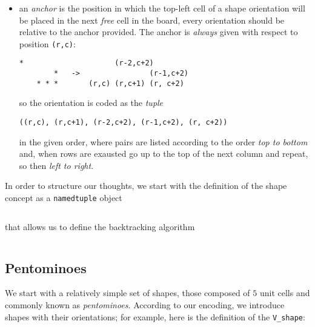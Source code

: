 \begin{itemize}
    \item an \textit{anchor} is the position in which the top-left cell of
    a shape orientation will be placed in the next \textit{free} cell in the
    board, every orientation should be relative to the anchor provided.
    The anchor is \textit{always} given with respect to position \verb|(r,c)|:
    \begin{Verbatim}[baselinestretch=0.8]
        *                     (r-2,c+2)
        *   ->                (r-1,c+2)
    * * *       (r,c) (r,c+1) (r, c+2)
    \end{Verbatim}
    so the orientation is coded as the \textit{tuple}
    \begin{Verbatim}[baselinestretch=0.8]
    ((r,c), (r,c+1), (r-2,c+2), (r-1,c+2), (r, c+2))
    \end{Verbatim}
    in the given order, where pairs are listed according to the order
    \textit{top to bottom} and, when rows are exausted go up to the top of the
    next column and repeat, so then \textit{left to right}.

\end{itemize}

In order to structure our thoughts, we start with the definition of the shape
concept as a \verb|namedtuple| object
\inputminted[baselinestretch=0.8,stripnl=false,firstline=4, lastline=6]{python}{backtracking/polyominoes.py}
\noindent that allows us to define the backtracking algorithm
\inputminted[baselinestretch=0.8,stripnl=false,firstline=8, lastline=60]
    {python}{backtracking/polyominoes.py}

\subsection{Pentominoes}

We start with a relatively simple set of shapes, those composed of $5$ unit
cells and commonly known as \textit{pentominoes}.  According to our encoding,
we introduce shapes with their orientations; for example, here is the
definition of the \verb|V_shape|:
\inputminted[baselinestretch=0.8,stripnl=false,firstline=193, lastline=205]
    {python}{backtracking/polyominoes.py}


